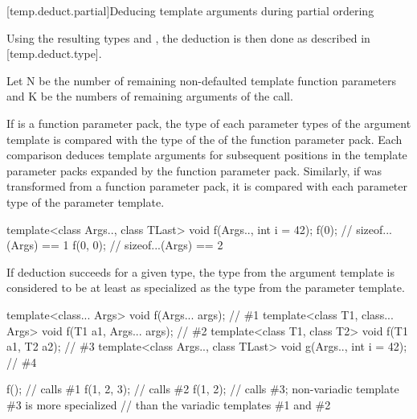 \documentclass{wg21}
\begin{document}
[temp.deduct.partial]{Deducing template arguments during partial ordering}

\pnum
Using the resulting types
and
,
the deduction is then done as described in [temp.deduct.type].

\begin{addedblock}
Let N be the number of remaining non-defaulted template function parameters and K be the numbers of remaining arguments of the call.
\end{addedblock}

If  is a function parameter pack, 
the type  of each 
parameter types of the argument template is compared with the type  of
the  of the function parameter pack. Each comparison
deduces template arguments for subsequent positions in the template parameter
packs expanded by the function parameter pack.
Similarly, if  was transformed from a function parameter pack,
it is compared with each   parameter type of the parameter template.
\begin{addedblock}
\begin{example}
\begin{codeblock}
template<class Args.., class TLast> void f(Args.., int i = 42);
f(0); // sizeof...(Args) == 1
f(0, 0); // sizeof...(Args) == 2
\end{codeblock}
\end{example}
\end{addedblock}


If deduction succeeds for a given type,
the type from the argument template is considered to be at least as specialized
as the type from the parameter template.
\begin{example}
    \begin{codeblock}
        template<class... Args>              void f(Args... args);        // \#1
        template<class T1, class... Args>    void f(T1 a1, Args... args); // \#2
        template<class T1, class T2>         void f(T1 a1, T2 a2);        // \#3
        template<class Args.., class TLast>  void g(Args.., int i = 42); //  \#4
        
        f();                // calls \#1
        f(1, 2, 3);         // calls \#2
        f(1, 2);            // calls \#3; non-variadic template \#3 is more specialized
        // than the variadic templates \#1 and \#2
    \end{codeblock}
\end{example}
\end{document}

